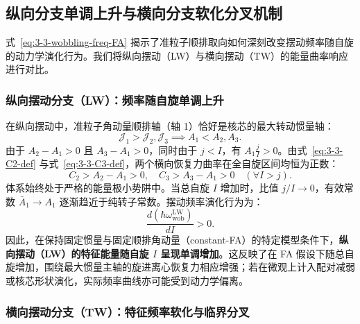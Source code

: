\subsection{纵向分支单调上升与横向分支软化分叉机制}\label{sec:3-3-3}

式~\eqref{eq:3-3-wobbling-freq-FA} 揭示了准粒子顺排取向如何深刻改变摆动频率随自旋的动力学演化行为。我们将纵向摆动（LW）与横向摆动（TW）的能量曲率响应进行对比。

\subsubsection{纵向摆动分支（LW）：频率随自旋单调上升}

在纵向摆动中，准粒子角动量顺排轴（轴 1）恰好是核芯的最大转动惯量轴：
\begin{equation}\label{eq:3-3-LW-condition}
\mathcal{J}_1 > \mathcal{J}_2, \mathcal{J}_3 \implies A_1 < A_2, A_3.
\end{equation}
由于 $A_2 - A_1 > 0$ 且 $A_3 - A_1 > 0$，同时由于 $j < I$，有 $A_1 \frac{j}{I} > 0$。由式~\eqref{eq:3-3-C2-def} 与式~\eqref{eq:3-3-C3-def}，两个横向恢复力曲率在全自旋区间均恒为正数：
\begin{equation}\label{eq:3-3-LW-curvatures}
C_2 > A_2 - A_1 > 0, \quad C_3 > A_3 - A_1 > 0 \quad (\forall I > j).
\end{equation}
体系始终处于严格的能量极小势阱中。当总自旋 $I$ 增加时，比值 $j/I \to 0$，有效常数 $\bar{A}_1 \to A_1$ 逐渐趋近于纯转子常数。摆动频率演化行为为：
\begin{equation}\label{eq:3-3-LW-trend}
\frac{d(\hbar \omega_{\text{wob}}^{\text{LW}})}{dI} > 0.
\end{equation}
因此，在保持固定惯量与固定顺排角动量（constant-FA）的特定模型条件下，\textbf{纵向摆动（LW）的特征能量随自旋 $I$ 呈现单调增加}。这反映了在 FA 假设下随总自旋增加，围绕最大惯量主轴的旋进离心恢复力相应增强；若在微观上计入配对减弱或核芯形状演化，实际频率曲线亦可能受到动力学偏离。

\subsubsection{横向摆动分支（TW）：特征频率软化与临界分叉}

